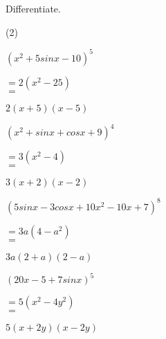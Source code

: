 




\clearpage
\printshortsolutions


\clearpage
\noindent Differentiate.
\begin{tasks}(2)
    \task \begin{exercise}$(x^2+5sinx-10)^5$
              \begin{envSolution}
                 $ =2(x^2-25)   $\\ 
                 $ =$			 
                     \begin{shortsolution}
  	                    $ 2(x+5)(x-5)$
                     \end{shortsolution}
              \end{envSolution}%
          \end{exercise}
 
    \task \begin{exercise}$(x^2+sinx+cosx+9)^4$
              \begin{envSolution}
                 $ =3(x^2-4)   $\\ 
                 $ =$			 
                     \begin{shortsolution}
  	                    $ 3(x+2)(x-2)$
                     \end{shortsolution}
              \end{envSolution}%
          \end{exercise}
 
    \task \begin{exercise}$(5sinx-3cosx+10x^2-10x+7)^8$
              \begin{envSolution}
                 $ =3a(4-a^2)   $\\ 
                 $ =$			 
                     \begin{shortsolution}
  	                    $ 3a(2+a)(2-a)$
                     \end{shortsolution}
              \end{envSolution}%
          \end{exercise}

    \task \begin{exercise}$(20x-5+7sinx)^5$
              \begin{envSolution}
                 $ =5(x^2-4y^2)   $\\
                 $ =$			 
                     \begin{shortsolution}
  	                    $ 5(x+2y)(x-2y)$
                     \end{shortsolution}
              \end{envSolution}%
          \end{exercise}
 
\end{tasks}




